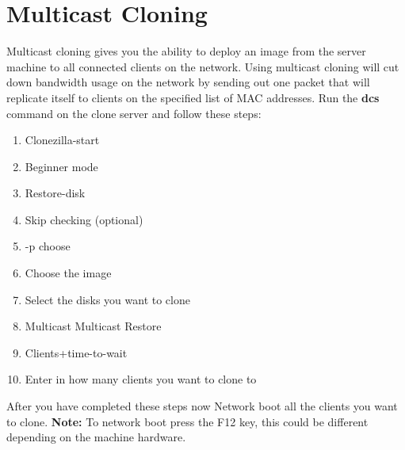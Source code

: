 \documentclass{article}
\begin{document}
\section{Multicast Cloning}
Multicast cloning gives you the ability to deploy an image from the server machine to all connected clients on the network. Using multicast cloning will cut down bandwidth usage on the network by sending out one packet that will replicate itself to clients on the specified list of MAC addresses.
\newline
Run the \textbf{dcs} command on the clone server and follow these steps:
\begin{enumerate}
	\item Clonezilla-start
	\item Beginner mode
	\item Restore-disk
	\item Skip checking (optional)
	\item -p choose
	\item Choose the image
	\item Select the disks you want to clone
	\item Multicast Multicast Restore
	\item Clients+time-to-wait
	\item Enter in how many clients you want to clone to
\end{enumerate}
After you have completed these steps now Network boot all the clients you want to clone.
\newline
\textbf{Note:} To network boot press the F12 key, this could be different depending on the machine hardware.
\end{document}

